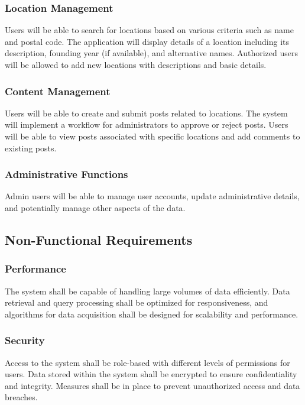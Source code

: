 \subsubsection{Location Management}
Users will be able to search for locations based on various criteria such as name and postal code. The application will display details of a location including its description, founding year (if available), and alternative names. Authorized users will be allowed to add new locations with descriptions and basic details.

\subsubsection{Content Management}
Users will be able to create and submit posts related to locations. The system will implement a workflow for administrators to approve or reject posts. Users will be able to view posts associated with specific locations and add comments to existing posts.

\subsubsection{Administrative Functions}
Admin users will be able to manage user accounts, update administrative details, and potentially manage other aspects of the data.

\subsection{Non-Functional Requirements}

\subsubsection{Performance}
The system shall be capable of handling large volumes of data efficiently. Data retrieval and query processing shall be optimized for responsiveness, and algorithms for data acquisition shall be designed for scalability and performance.

\subsubsection{Security}
Access to the system shall be role-based with different levels of permissions for users. Data stored within the system shall be encrypted to ensure confidentiality and integrity. Measures shall be in place to prevent unauthorized access and data breaches.

